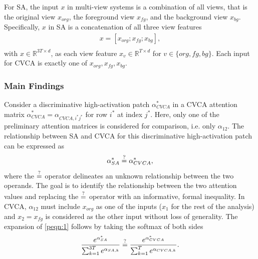 For SA, the input $x$ in multi-view systems is a combination of all views, that is the original view $x_{org}$, the foreground view $x_{fg}$, and the background view $x_{bg}$. Specifically, $x$ in SA is a concatenation of all three view features
\begin{equation}
\begin{aligned}
    x = [x_{org} ; x_{fg} ; x_{bg}], \\
\end{aligned}
\end{equation}
with $x \in \mathbb{R}^{3T \times d}$, as each view feature $x_v \in \mathbb{R}^{T \times d}$ for $v \in \{org, fg, bg\}$. Each input for CVCA is exactly one of $x_{org}, x_{fg}, x_{bg}$.

\subsubsection{Main Findings}
Consider a discriminative high-activation patch $\alpha^*_{CVCA}$ in a CVCA attention matrix $\alpha^*_{CVCA} = \alpha_{CVCA,i^*j^*}$ for row $i^*$ at index $j^*$. Here, only one of the preliminary attention matrices is considered for comparison, i.e. only $\alpha_{12}$. The relationship between SA and CVCA for this discriminative high-activation patch can be expressed as
\begin{equation}
\begin{aligned}
    \alpha^*_{SA} \stackrel{?}{=} \alpha^*_{CVCA}, \\
\end{aligned}
\label{peqn:1}
\end{equation}
where the $\stackrel{?}{=}$ operator delineates an unknown relationship between the two operands. The goal is to identify the relationship between the two attention values and replacing the $\stackrel{?}{=}$ operator with an informative, formal inequality. In CVCA, $\alpha_{12}$ must include $x_{org}$ as one of the inputs ($x_1$ for the rest of the analysis) and $x_2 = x_{fg}$ is considered as the other input without loss of generality. The expansion of \ref{peqn:1} follows by taking the softmax of both sides
\begin{equation}
\begin{aligned}
    \frac{e^{\alpha^*_{SA}}}{\sum_{k=1}^{3T} e^{\alpha_{SA,k}}} \stackrel{?}{=} \frac{e^{\alpha^*_{CVCA}}}{\sum_{k=1}^{T} e^{\alpha_{CVCA,k}}}. \\
\end{aligned}
\label{peqn:2}
\end{equation}
